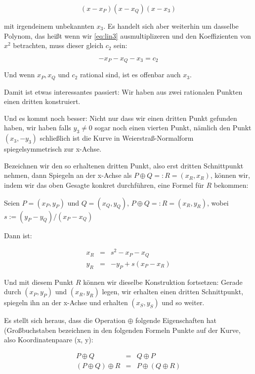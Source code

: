 \documentclass{article}
\begin{document}
\begin{equation} \label{eq:lin3}
  (x - x_P) (x - x_Q) (x - x_3)
\end{equation}

mit irgendeinem unbekannten $x_3$. Es handelt sich aber weiterhin um dasselbe
Polynom, das heißt wenn wir \eqref{eq:lin3} ausmultiplizeren und den
Koeffizienten von $x^2$ betrachten, muss dieser gleich $c_2$ sein:

\begin{equation}
  - x_P - x_Q - x_3 = c_2
\end{equation}

Und wenn $x_P, x_Q$ und $c_2$ rational sind, ist es offenbar auch $x_3$.

Damit ist etwas interessantes passiert: Wir haben aus zwei rationalen Punkten
einen dritten konstruiert.

Und es kommt noch besser: Nicht nur dass wir einen dritten Punkt gefunden
haben, wir haben falls $y_3 \ne 0$ sogar noch einen vierten Punkt, nämlich den
Punkt $(x_3, -y_3)$ schließlich ist die Kurve in Weierstraß-Normalform
spiegelsymmetrisch zur x-Achse.

Bezeichnen wir den so erhaltenen dritten Punkt, also erst dritten Schnittpunkt
nehmen, dann Spiegeln an der x-Achse als $P \oplus Q =: R = (x_R, x_R)$,
können wir, indem wir das oben Gesagte konkret durchführen, eine Formel für $R$
bekommen:


Seien $P=(x_P, y_P)$ und $Q=(x_Q, y_Q)$, $P \oplus Q =: R = (x_R, y_R)$, wobei
$s := (y_P - y_Q) / (x_P - x_Q)$

Dann ist:

\begin{eqnarray*}
  x_R & = & s^2 - x_P - x_Q \\
  y_R & = & - y_P + s (x_P - x_R)
\end{eqnarray*}

Und mit diesem Punkt $R$ können wir dieselbe Konstruktion fortsetzen: Gerade
durch $(x_P, y_P)$ und $(x_R, y_R)$ legen, wir erhalten einen dritten
Schnittpunkt, spiegeln ihn an der x-Achse und erhalten $(x_S, y_S)$ und so
weiter.

Es stellt sich heraus, dass die Operation $\oplus$ folgende Eigenschaften hat
(Großbuchstaben bezeichnen in den folgenden Formeln Punkte auf der Kurve, also
Koordinatenpaare (x, y):

\begin{eqnarray*}
  P \oplus Q & = & Q \oplus P \\
  (P \oplus Q) \oplus R & = & P \oplus (Q \oplus R)
\end{eqnarray*}
\end{document}
